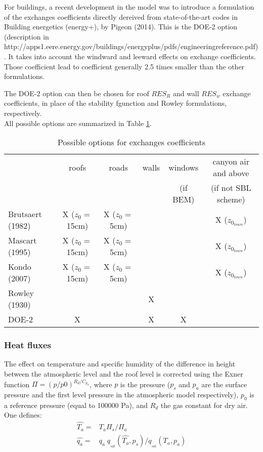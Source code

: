 For buildings, a recent development in the model was to introduce a formulation of the exchanges coefficients directly dereived from state-of-the-art codes in Building energetics (energy+), by Pigeon \etal (2014)\nocite{Pigeon2014}. This is the DOE-2 option (description in http://apps1.eere.energy.gov/buildings/energyplus/pdfs/engineeringreference.pdf). It takes into account the windward and leeward effects on exchange coefficients. Those coefficient lead to coefficient generally 2.5 times smaller than the other formulations.

The DOE-2 option can then be chosen for roof $RES_{R}$ and wall $RES_w$ exchange coefficients, in place of the stability fgunction and Rowley formulations, respectively. \\

All possible options are summarized in Table \ref{RES_urban}.\\
\begin{table}
\begin{tabular}{l|ccccc}
	\hline
	& roofs & roads & walls & windows &canyon air and above  \\
	&       &       &       & (if BEM) &(if not SBL scheme) \\
	\hline
	Brutsaert (1982) & X ($z_0=$15cm) & X ($z_0=$5cm) & & & X ($z_{0_{town}}$) \\
	Mascart   (1995) & X ($z_0=$15cm) & X ($z_0=$5cm) & & & X ($z_{0_{town}}$) \\
	Kondo \etal (2007) & X ($z_0=$15cm) & X ($z_0=$5cm) & & & X ($z_{0_{town}}$) \\
	Rowley (1930) & &  & X && \\
	DOE-2 & X &  & X & X & \\
	\hline
\end{tabular}
\caption{Possible options for exchanges coefficients\label{RES_urban}}
\end{table}

\subsubsection{Heat fluxes}

The effect on temperature and specific humidity of the difference in height between the atmospheric level and the roof level is corrected using the Exner function $\Pi=(p/p0)^{R_d/C_{p_d}}$, where $p$ is the pressure ($p_s$ and $p_a$ are the surface pressure and the first level pressure in the atmospheric model respectively), $p_0$ is a reference pressure (equal to 100000 Pa), and $R_d$ the gas constant for dry air. One defines:
\begin{eqnarray}
\hat{T_a} =& T_{a}\Pi_s/\Pi_a  \nonumber \\
\hat{q_a} =& q_a \; q_{_{sat}}(\hat{T_{a}},p_s) /
q_{_{sat}}(T_{a},p_a) \nonumber
\end{eqnarray}

